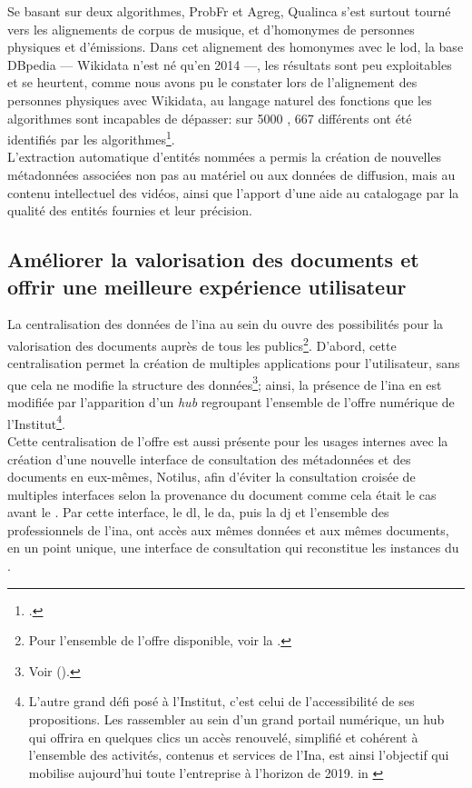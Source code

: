 Se basant sur deux algorithmes, ProbFr et Agreg, Qualinca s'est surtout tourné vers les alignements de corpus de musique, et d'homonymes de personnes physiques et d'émissions. Dans cet alignement des homonymes avec le \ac{lod}, la base DBpedia --- Wikidata n'est né qu'en 2014 ---, les résultats sont peu exploitables et se heurtent, comme nous avons pu le constater lors de l'alignement des personnes physiques avec Wikidata, au langage naturel des fonctions que les algorithmes sont incapables de dépasser: sur 5000 , 667 différents ont été identifiés par les algorithmes\footcite[p.133]{alquier_production_2017}.\\

L'extraction automatique d'entités nommées a permis la création de nouvelles métadonnées associées non pas au matériel ou aux données de diffusion, mais au contenu intellectuel des vidéos, ainsi que l'apport d'une aide au catalogage par la qualité des entités fournies et leur précision.

\subsection{\label{III-B-3-c}Améliorer la valorisation des documents et offrir une meilleure expérience utilisateur}

La centralisation des données de l'\ac{ina} au sein du \ldd ouvre des possibilités pour la valorisation des documents auprès de tous les publics\footnote{Pour l'ensemble de l'offre disponible, voir la .}. D'abord, cette centralisation permet la création de multiples applications pour l'utilisateur, sans que cela ne modifie la structure des données\footnote{Voir  ().}; ainsi, la présence de l'\ac{ina} en est modifiée par l'apparition d'un \textit{hub} regroupant l'ensemble de l'offre numérique de l'Institut\footnote{\og L’autre grand défi posé à l’Institut, c’est celui de l’accessibilité de ses propositions. Les rassembler au sein d’un grand portail numérique, un hub qui offrira en quelques clics un accès renouvelé, simplifié et cohérent à l’ensemble des activités, contenus et services de l’Ina, est ainsi l’objectif qui mobilise aujourd’hui toute l’entreprise à l’horizon de 2019.\fg{} in \cite{vallet_ina_nodate}}.\\

Cette centralisation de l'offre est aussi présente pour les usages internes avec la création d'une nouvelle interface de consultation des métadonnées et des documents en eux-mêmes, Notilus, afin d'éviter la consultation croisée de multiples interfaces selon la provenance du document comme cela était le cas avant le \ldd. Par cette interface, le \ac{dl}, le \ac{da}, puis la \ac{dj} et l'ensemble des professionnels de l'\ac{ina}, ont accès aux mêmes données et aux mêmes documents, en un point unique, une interface de consultation qui reconstitue les instances du \ldd.\\

